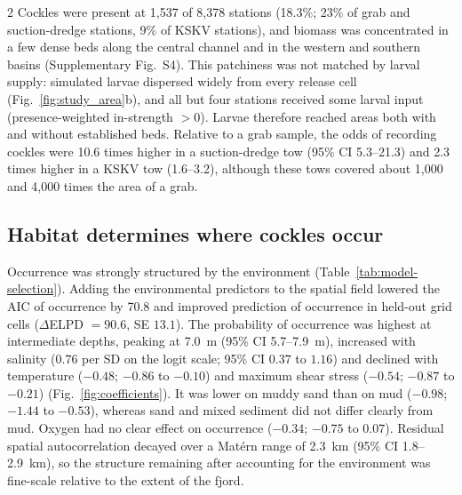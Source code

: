 \begin{spacing}{2}
Cockles were present at 1{,}537 of 8{,}378 stations (18.3\%; 23\% of grab and suction-dredge stations, 9\% of KSKV stations), and biomass was concentrated in a few dense beds along the central channel and in the western and southern basins (Supplementary Fig.~S4). This patchiness was not matched by larval supply: simulated larvae dispersed widely from every release cell (Fig.~\ref{fig:study_area}b), and all but four stations received some larval input (presence-weighted in-strength $>0$). Larvae therefore reached areas both with and without established beds.  Relative to a grab sample, the odds of recording cockles were 10.6 times higher in a suction-dredge tow (95\% CI 5.3--21.3) and 2.3 times higher in a KSKV tow (1.6--3.2), although these tows covered about 1{,}000 and 4{,}000 times the area of a grab.

\subsection{Habitat determines where cockles occur}

Occurrence was strongly structured by the environment (Table~\ref{tab:model-selection}). Adding the environmental predictors to the spatial field lowered the AIC of occurrence by 70.8 and improved prediction of occurrence in held-out grid cells ($\Delta$ELPD $=90.6$, SE $13.1$). The probability of occurrence was highest at intermediate depths, peaking at 7.0~m (95\% CI 5.7--7.9~m), increased with salinity ($0.76$ per SD on the logit scale; 95\% CI $0.37$ to $1.16$) and declined with temperature ($-0.48$; $-0.86$ to $-0.10$) and maximum shear stress ($-0.54$; $-0.87$ to $-0.21$) (Fig.~\ref{fig:coefficients}). It was lower on muddy sand than on mud ($-0.98$; $-1.44$ to $-0.53$), whereas sand and mixed sediment did not differ clearly from mud. Oxygen had no clear effect on occurrence ($-0.34$; $-0.75$ to $0.07$). Residual spatial autocorrelation decayed over a Mat\'ern range of 2.3~km (95\% CI 1.8--2.9~km), so the structure remaining after accounting for the environment was fine-scale relative to the extent of the fjord.


\end{spacing}
